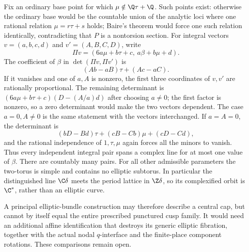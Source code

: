\begin{remark}
Fix an ordinary base point for which
$\mu\notin\Q\tau+\Q$.  Such points exist: otherwise the
ordinary base would be the countable union of the analytic loci
where one rational relation $\mu=r\tau+s$ holds; Baire's
theorem would force one such relation identically, contradicting
that $P$ is a nontorsion section.  For integral vectors
$v=(a,b,c,d)$ and $v'=(A,B,C,D)$, write
\[
 \Pi v=(6a\mu+b\tau+c,\ a\beta+b\mu+d).
\]
The coefficient of $\beta$ in
$\det(\Pi v,\Pi v')$ is
\[
 (Ab-aB)\tau+(Ac-aC).
\]
If it vanishes and one of $a,A$ is nonzero, the first three
coordinates of $v,v'$ are rationally proportional.  The
remaining determinant is
$(6a\mu+b\tau+c)(D-(A/a)d)$ after choosing $a\ne0$;
the first factor is nonzero, so a zero determinant would make
the two vectors dependent.  The case $a=0,A\ne0$ is the
same statement with the vectors interchanged.  If $a=A=0$,
the determinant is
\[
 (bD-Bd)\tau+(cB-Cb)\mu+(cD-Cd),
\]
and the rational independence of $1,\tau,\mu$ again forces
all the minors to vanish.  Thus every independent integral
pair spans a complex line for at most one value of $\beta$.
There are countably many pairs.  For all other admissible
parameters the two-torus is simple and contains no elliptic
subtorus.  In particular the distinguished line $\C\delta$
meets the period lattice in $\Z\delta$, so its complexified
orbit is $\C^*$, rather than an elliptic curve.

A principal elliptic-bundle construction may therefore describe
a central cap, but cannot by itself equal the entire prescribed
punctured cusp family.  It would need an additional affine
identification that destroys its generic elliptic fibration,
together with the actual nodal $q$-interface and the finite-place
component rotations.  These comparisons remain open.
\end{remark}
